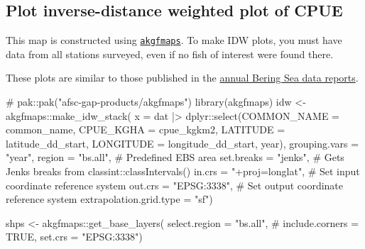 \documentclass[
  letterpaper,
  oneside,
  open=any]{scrbook}
\newenvironment{Shaded}{\begin{snugshade}}{\end{snugshade}}
\newcommand{\AttributeTok}[1]{\textcolor[rgb]{0.40,0.45,0.13}{#1}}
\newcommand{\CommentTok}[1]{\textcolor[rgb]{0.37,0.37,0.37}{#1}}
\newcommand{\FunctionTok}[1]{\textcolor[rgb]{0.28,0.35,0.67}{#1}}
\newcommand{\NormalTok}[1]{\textcolor[rgb]{0.00,0.23,0.31}{#1}}
\newcommand{\OtherTok}[1]{\textcolor[rgb]{0.00,0.23,0.31}{#1}}
\newcommand{\SpecialCharTok}[1]{\textcolor[rgb]{0.37,0.37,0.37}{#1}}
\newcommand{\StringTok}[1]{\textcolor[rgb]{0.13,0.47,0.30}{#1}}
\begin{document}
\subsection{Plot inverse-distance weighted plot of
CPUE}\label{plot-inverse-distance-weighted-plot-of-cpue}

This map is constructed using
\href{https://github.com/afsc-gap-products/akgfmaps}{\texttt{akgfmaps}}.
To make IDW plots, you must have data from all stations surveyed, even
if no fish of interest were found there.

These plots are similar to those published in the
\href{https://www.fisheries.noaa.gov/alaska/science-data/groundfish-assessment-program-bottom-trawl-surveys\#communications}{annual
Bering Sea data reports}.

\begin{Shaded}
\begin{Highlighting}[]
\CommentTok{\# pak::pak("afsc{-}gap{-}products/akgfmaps")}
\FunctionTok{library}\NormalTok{(akgfmaps)}
\NormalTok{idw }\OtherTok{\textless{}{-}}\NormalTok{ akgfmaps}\SpecialCharTok{::}\FunctionTok{make\_idw\_stack}\NormalTok{(}
  \AttributeTok{x =}\NormalTok{ dat }\SpecialCharTok{|\textgreater{}} 
\NormalTok{    dplyr}\SpecialCharTok{::}\FunctionTok{select}\NormalTok{(}\AttributeTok{COMMON\_NAME =}\NormalTok{ common\_name, }
                  \AttributeTok{CPUE\_KGHA =}\NormalTok{ cpue\_kgkm2, }
                  \AttributeTok{LATITUDE =}\NormalTok{ latitude\_dd\_start, }
                  \AttributeTok{LONGITUDE =}\NormalTok{ longitude\_dd\_start, }
\NormalTok{                  year), }
  \AttributeTok{grouping.vars =} \StringTok{"year"}\NormalTok{, }
  \AttributeTok{region =} \StringTok{"bs.all"}\NormalTok{, }\CommentTok{\# Predefined EBS area}
  \AttributeTok{set.breaks =} \StringTok{"jenks"}\NormalTok{, }\CommentTok{\# Gets Jenks breaks from classint::classIntervals()}
  \AttributeTok{in.crs =} \StringTok{"+proj=longlat"}\NormalTok{, }\CommentTok{\# Set input coordinate reference system}
  \AttributeTok{out.crs =} \StringTok{"EPSG:3338"}\NormalTok{, }\CommentTok{\# Set output coordinate reference system}
  \AttributeTok{extrapolation.grid.type =} \StringTok{"sf"}\NormalTok{)}

\NormalTok{shps }\OtherTok{\textless{}{-}}\NormalTok{ akgfmaps}\SpecialCharTok{::}\FunctionTok{get\_base\_layers}\NormalTok{(}
  \AttributeTok{select.region =} \StringTok{"bs.all"}\NormalTok{, }
  \CommentTok{\# include.corners = TRUE, }
  \AttributeTok{set.crs =} \StringTok{"EPSG:3338"}\NormalTok{)}


\end{Highlighting}
\end{Shaded}
\end{document}
